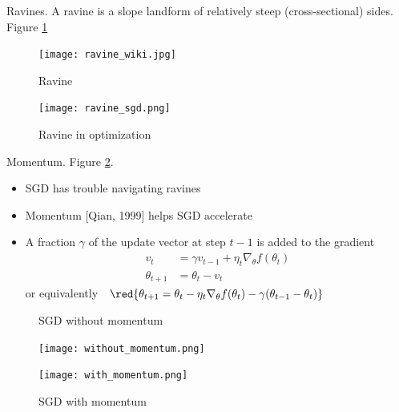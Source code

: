 \documentclass[english]{article}
\begin{document}

\item {Ravines}.
A ravine is a slope landform of relatively steep (cross-sectional) sides. Figure \ref{Ravine}

\begin{figure}
\centering
\begin{minipage}{.5\textwidth}
  \centering
  \texttt{[image: ravine\_wiki.jpg]}
  \caption{Ravine}
  \label{Ravine}
\end{minipage}%
\begin{minipage}{.5\textwidth}
  \centering
  \texttt{[image: ravine\_sgd.png]}
  \caption{Ravine in optimization}
\end{minipage}
\end{figure}










\item {Momentum}. Figure \ref{SGD with momentum}.
\begin{itemize}
\item SGD has trouble navigating ravines
\item Momentum [Qian, 1999] helps SGD accelerate
\item A fraction $\gamma$ of the update vector at step $t-1$ is added to the gradient
\begin{align*}
v_{t} &= \gamma v_{t-1} + \eta_t \nabla_\theta f(\theta_t)  \\
\theta_{t+1} &= \theta_t - v_t
\end{align*}
or equivalently $\ \ \red{\theta_{t+1} = \theta_t - \eta_t \nabla_\theta f(\theta_t) -\gamma (\theta_{t-1}-\theta_t)}$
\end{itemize}

\begin{figure}
\centering
\begin{minipage}{.5\textwidth}
  \centering
  \caption{SGD without momentum}
  \texttt{[image: without\_momentum.png]}
    \label{SGD with momentum}
\end{minipage}%
\begin{minipage}{.5\textwidth}
  \centering
  \caption{SGD with momentum}
  \texttt{[image: with\_momentum.png]}
\end{minipage}
\end{figure}
\end{document}
